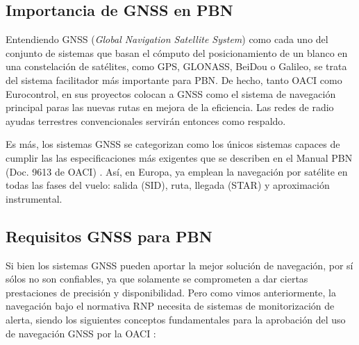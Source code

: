 \subsection{Importancia de GNSS en PBN}
\label{subsec:GNSS}

Entendiendo GNSS (\textit{Global Navigation Satellite System}) como cada uno del conjunto de sistemas que basan el cómputo del posicionamiento de un blanco en una constelación de satélites, como GPS, GLONASS, BeiDou o Galileo, se trata del sistema facilitador más importante para PBN. De hecho, tanto OACI como Eurocontrol, en sus proyectos colocan a GNSS como el sistema de navegación principal paras las nuevas rutas en mejora de la eficiencia. Las redes de radio ayudas terrestres convencionales servirán entonces como respaldo.

Es más, los sistemas GNSS se categorizan como los únicos sistemas capaces de cumplir las las especificaciones más exigentes que se describen en el Manual PBN (Doc. 9613 de OACI) \cite{OACI_PBN}. Así, en Europa,  ya emplean la navegación por satélite en todas las fases del vuelo: salida (SID), ruta, llegada (STAR) y aproximación instrumental.



\subsection{Requisitos GNSS para PBN}
\label{subsec:RequisitosGNSS}

Si bien los sistemas GNSS pueden aportar la mejor solución de navegación, por sí sólos no son confiables, ya que solamente se comprometen a dar ciertas prestaciones de precisión y disponibilidad. Pero como vimos anteriormente, la navegación bajo el normativa RNP necesita de sistemas de monitorización de alerta, siendo los siguientes conceptos fundamentales para la aprobación del uso de navegación GNSS por la OACI \cite{PBN_AESA}:


